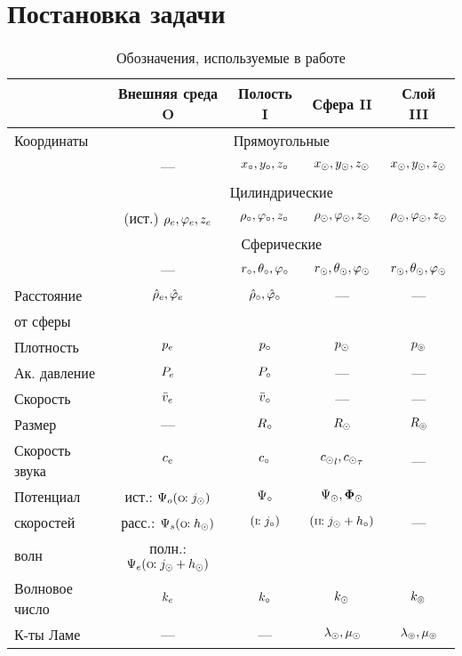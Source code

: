 \section{Постановка задачи} 
\begin{table}[h]
\begin{tabular}{|l|c|c|c|c|}
\hline
 &Внешняя среда \scriptsize{O} &Полость \scriptsize{I} &Сфера \scriptsize{II}&Слой \scriptsize{III}\\
\hline
Координаты &\multicolumn{4}{|c|}{Прямоугольные}\\
\cline{2-5}
& --- & $x_\circ, y_\circ, z_\circ$ & $x_\odot, y_\odot, z_\odot$ & $x_\odot, y_\odot, z_\odot$\\
\cline{2-5}
&\multicolumn{4}{|c|}{Цилиндрические}\\
\cline{2-5}
&(ист.) $\rho_e, \varphi_e, z_e$ & $\rho_\circ, \varphi_\circ, z_\circ$ & $\rho_\odot, \varphi_\odot, z_\odot$ & $\rho_\odot, \varphi_\odot, z_\odot$\\
\cline{2-5}
&\multicolumn{4}{|c|}{Сферические}\\
\cline{2-5}
& --- & $r_\circ, \theta_\circ, \varphi_\circ$ & $r_\odot, \theta_\odot, \varphi_\odot$ & $r_\odot, \theta_\odot, \varphi_\odot$\\
\hline
Расстояние & $\hat{\rho}_e, \hat{\varphi}_e$ & $\hat{\rho}_\circ, \hat{\varphi}_\circ$ & --- & ---\\
от сферы &&&&\\
\hline
Плотность &$p_e$ &$p_\circ$ &$p_\odot$ &$p_\circledcirc$\\
\hline
Ак. давление &$P_e$ &$P_\circ$ & --- & ---\\
\hline
Скорость &$\bar{v}_e$ &$\bar{v}_\circ$ & --- & ---\\
\hline
Размер & --- & $R_\circ$ & $R_\odot$ & $R_\circledcirc$\\
\hline
Скорость звука & $c_e$ & $c_\circ$ & ${c_\odot}_l, {c_\odot}_\tau$ & ---\\
\hline
Потенциал & ист.: $\Psi_o (\text{\scriptsize{O}}\!\!: j_\odot)$ &$\Psi_\circ$ & $\Psi_\odot, \mathbf{\Phi}_\odot$ & \\
скоростей&расс.: $\Psi_s(\text{\scriptsize{O}}\!\!: h_\odot)$& $(\text{\scriptsize{I}}\!\!: j_\circ)$ &$(\text{\scriptsize{II}}\!\!: j_\odot + h_\circ)$ & --- \\
волн&полн.: $\Psi_e (\text{\scriptsize{O}}\!\!: j_\odot + h_\odot)$&&&\\
\hline
Волновое число &$k_e$ &$k_\circ$ &$k_\odot$ &$k_\circledcirc$\\
\hline
К-ты Ламе & --- & --- & $\lambda_\odot, \mu_\odot$ & $\lambda_\circledcirc, \mu_\circledcirc$\\
\hline
\end{tabular}
\caption{Обозначения, используемые в работе}
\end{table}


